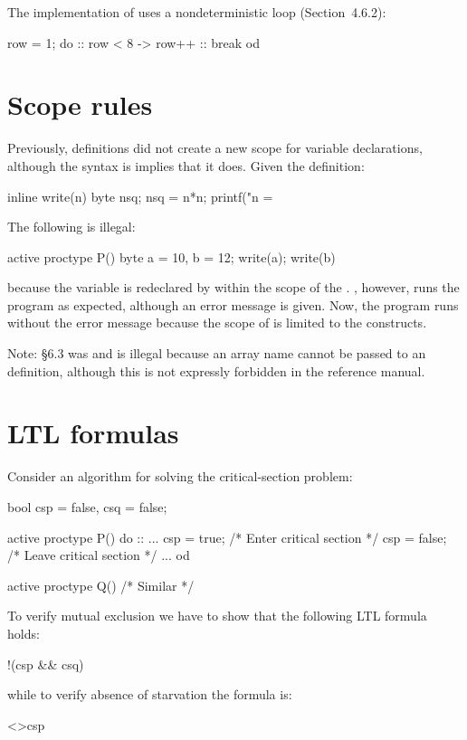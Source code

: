 \documentclass[11pt]{article}
\begin{document}
The implementation of  uses a nondeterministic loop
(Section~4.6.2):
\begin{frag}
  row = 1;
  do
  :: row < 8 -> row++
  :: break
  od
\end{frag}

\section{Scope rules}

Previously,  definitions did not create a new scope for
variable declarations, although the syntax is implies that it
does. Given the definition:
\begin{frag}
inline write(n) {
  byte nsq;
  nsq = n*n;
  printf("n = %
}
\end{frag}

The following is illegal:
\begin{frag}
active proctype P() {
  byte a = 10, b = 12;
  write(a);
  write(b)
}
\end{frag}

because the variable  is redeclared by  within the
scope of the . \spn{}, however, runs the program as
expected, although an error message is given. Now, the program runs
without the error message because the scope of  is limited to the
 constructs.


Note: \S{}6.3 was and is illegal because an array name cannot be passed
to an  definition, although this is not expressly forbidden in
the \prm{} reference manual.

\newpage

\section{LTL formulas}

Consider an algorithm for solving the critical-section problem:
\begin{frag}
bool csp = false, csq = false;

active proctype P() {
  do
  ::
    ...
    csp = true;   /* Enter critical section */
    csp = false; /* Leave critical section */
    ...
  od
}

active proctype Q() { /* Similar */ }
\end{frag}
To verify mutual exclusion we have to show that the following LTL
formula holds:
\begin{frag}
[]!(csp && csq)
\end{frag}
while to verify absence of starvation the formula is:
\begin{frag}
[]<>csp
\end{frag}
\end{document}

